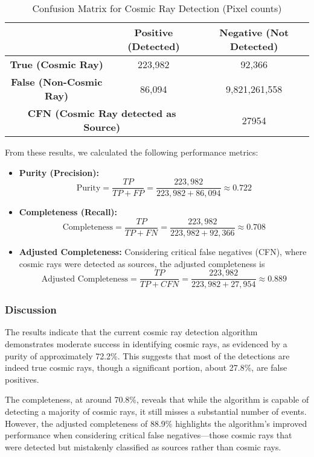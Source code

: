 \begin{table}[H]
    \centering
    \caption{Confusion Matrix for Cosmic Ray Detection (Pixel counts)}
    \label{tab:confusion_matrix}
    \begin{tabular}{*3c}
        \hline
        & \textbf{Positive (Detected)} & \textbf{Negative (Not Detected)} \\
        \hline
        \textbf{True (Cosmic Ray)}  & 223,982 & 92,366 \\
        \textbf{False (Non-Cosmic Ray)} & 86,094  & 9,821,261,558 \\
        \hline
         \multicolumn{2}{c}{\textbf{CFN (Cosmic Ray detected as Source)}} & 27954 \\
    \end{tabular}
\end{table}

From these results, we calculated the following performance metrics:

\begin{itemize}
    \item \textbf{Purity (Precision):} 
    \begin{equation*}
        \text{Purity} = \frac{TP}{TP + FP} = \frac{223,982}{223,982 + 86,094} \approx 0.722
    \end{equation*}
    \item \textbf{Completeness (Recall):} 
    \begin{equation*}
        \text{Completeness} = \frac{TP}{TP + FN} = \frac{223,982}{223,982 + 92,366} \approx 0.708
    \end{equation*}
    \item \textbf{Adjusted Completeness:} Considering critical false negatives (CFN), where cosmic rays were detected as sources, the adjusted completeness is 
    \begin{equation*}
        \text{Adjusted Completeness} = \frac{TP}{TP + CFN} = \frac{223,982}{223,982 + 27,954} \approx 0.889
    \end{equation*}
\end{itemize}

\subsubsection{Discussion}

The results indicate that the current cosmic ray detection algorithm demonstrates moderate success in identifying cosmic rays, as evidenced by a purity of approximately 72.2\%. This suggests that most of the detections are indeed true cosmic rays, though a significant portion, about 27.8\%, are false positives.

The completeness, at around 70.8\%, reveals that while the algorithm is capable of detecting a majority of cosmic rays, it still misses a substantial number of events. However, the adjusted completeness of 88.9\% highlights the algorithm's improved performance when considering critical false negatives—those cosmic rays that were detected but mistakenly classified as sources rather than cosmic rays. 

